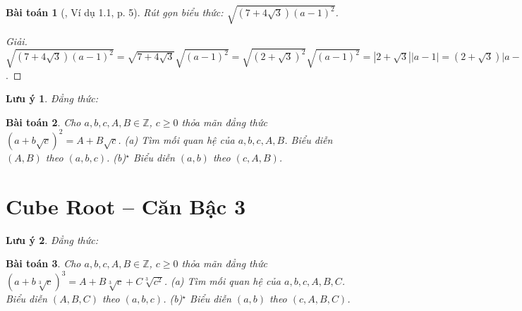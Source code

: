 \documentclass{article}
\newtheorem{baitoan}{Bài toán}
\newtheorem{luuy}{Lưu ý}
\begin{document}
\begin{baitoan}[\cite{TLCT_THCS_Toan_9_dai_so}, Ví dụ 1.1, p. 5]
	Rút gọn biểu thức: $\sqrt{(7 + 4\sqrt{3})(a - 1)^2}$.
\end{baitoan}

\begin{proof}[Giải]
	$\sqrt{(7 + 4\sqrt{3})(a - 1)^2} = \sqrt{7 + 4\sqrt{3}}\sqrt{(a - 1)^2} = \sqrt{(2 + \sqrt{3})^2}\sqrt{(a - 1)^2} = |2 + \sqrt{3}||a - 1| = (2 + \sqrt{3})|a - 1|$.
\end{proof}

\begin{luuy}
	Đẳng thức: 
\end{luuy}

\begin{baitoan}
	Cho $a,b,c,A,B\in\mathbb{Z}$, $c\ge0$ thỏa mãn đẳng thức $(a + b\sqrt{c})^2 = A + B\sqrt{c}$. (a) Tìm mối quan hệ của $a,b,c,A,B$. Biểu diễn $(A,B)$ theo $(a,b,c)$. (b)${}^\star$ Biểu diễn $(a,b)$ theo $(c,A,B)$.
\end{baitoan}


\section{Cube Root -- Căn Bậc 3}

\begin{luuy}
	Đẳng thức: 
\end{luuy}

\begin{baitoan}
	Cho $a,b,c,A,B\in\mathbb{Z}$, $c\ge0$ thỏa mãn đẳng thức $(a + b\sqrt[3]{c})^3 = A + B\sqrt[3]{c} + C\sqrt[3]{c^2}$. (a) Tìm mối quan hệ của $a,b,c,A,B,C$. Biểu diễn $(A,B,C)$ theo $(a,b,c)$. (b)${}^\star$ Biểu diễn $(a,b)$ theo $(c,A,B,C)$.
\end{baitoan}


\printbibliography[heading=bibintoc]
	
\end{document}
